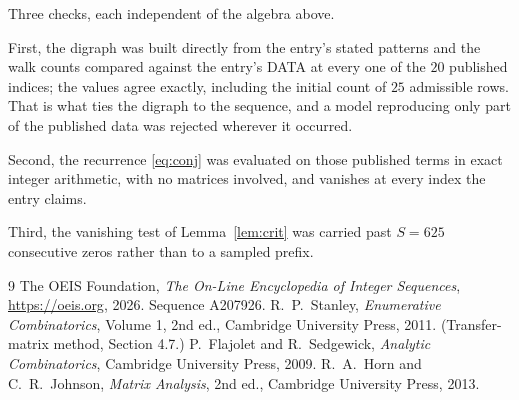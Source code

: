 \documentclass[11pt,a4paper]{article}
\theoremstyle{plain}
\theoremstyle{definition}
\begin{document}
Three checks, each independent of the algebra above.

First, the digraph was built directly from the entry's stated patterns and the walk counts
compared against the entry's DATA at every one of the $20$ published indices; the
values agree exactly, including the initial count of $25$ admissible rows. That is
what ties the digraph to the sequence, and a model reproducing only part of the published
data was rejected wherever it occurred.

Second, the recurrence \eqref{eq:conj} was evaluated on those published terms in exact
integer arithmetic, with no matrices involved, and vanishes at every index the entry claims.

Third, the vanishing test of Lemma~\ref{lem:crit} was carried past $S=625$ consecutive
zeros rather than to a sampled prefix.

\begin{thebibliography}{9}
 The OEIS Foundation, \emph{The On-Line Encyclopedia of Integer
Sequences}, \url{https://oeis.org}, 2026. Sequence A207926.
 R.~P.~Stanley, \emph{Enumerative Combinatorics}, Volume 1, 2nd ed.,
Cambridge University Press, 2011. (Transfer-matrix method, Section 4.7.)
 P.~Flajolet and R.~Sedgewick, \emph{Analytic Combinatorics}, Cambridge
University Press, 2009.
 R.~A.~Horn and C.~R.~Johnson, \emph{Matrix Analysis}, 2nd ed., Cambridge
University Press, 2013.
\end{thebibliography}
\end{document}
